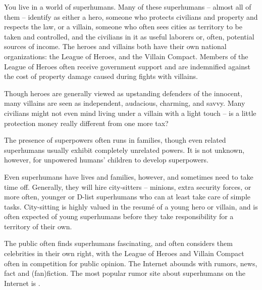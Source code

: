 \documentclass[blue]{LRSguildcamp1}
\begin{document}
\name{\bWorld{}}
You live in a world of superhumans.  Many of these superhumans -- almost all of them -- identify as either a hero, someone who protects civilians and property and respects the law, or a villain, someone who often sees cities as territory to be taken and controlled, and the civilians in it as useful laborers or, often, potential sources of income.  The heroes and villains both have their own national organizations: the League of Heroes, and the Villain Compact.  Members of the League of Heroes often receive government support and are indemnified against the cost of property damage caused during fights with villains.

Though heroes are generally viewed as upstanding defenders of the innocent, many villains are seen as independent, audacious, charming, and savvy.  Many civilians might not even mind living under a villain with a light touch -- is a little protection money really different from one more tax?

The presence of superpowers often runs in families, though even related superhumans usually exhibit completely unrelated powers.  It is not unknown, however, for unpowered humans' children to develop superpowers.

Even superhumans have lives and families, however, and sometimes need to take time off.  Generally, they will hire city-sitters -- minions, extra security forces, or more often, younger or D-list superhumans who can at least take care of simple tasks.  City-sitting is highly valued in the resum\'e of a young hero or villain, and is often expected of young superhumans before they take responsibility for a territory of their own.

The public often finds superhumans fascinating, and often considers them celebrities in their own right, with the League of Heroes and Villain Compact often in competition for public opinion.  The Internet abounds with rumors, news, fact and (fan)fiction.  The most popular rumor site about superhumans on the Internet is \pTweenSite{}.
\end{document}
